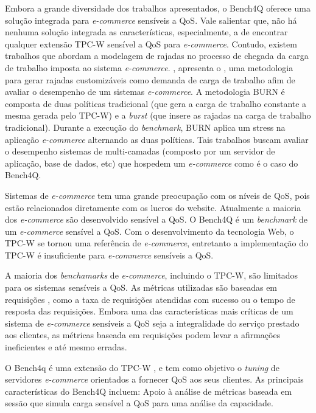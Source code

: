 Embora a grande diversidade dos trabalhos apresentados, o Bench4Q oferece uma solução integrada para \textit{e-commerce} sensíveis a QoS. Vale salientar que, não há nenhuma solução integrada as características, especialmente, a de encontrar qualquer extensão TPC-W sensível a QoS para \textit{e-commerce}. Contudo, existem trabalhos que abordam a modelagem de rajadas no processo de chegada da carga de trabalho imposta ao sistema \textit{e-commerce}. , apresenta o , uma metodologia para gerar rajadas customizáveis como demanda de carga de trabalho afim de avaliar o desempenho de um sistemas \textit{e-commerce}. A metodologia BURN é composta de duas políticas tradicional (que gera a carga de trabalho constante a mesma gerada pelo TPC-W) e a \textit{burst} (que insere as rajadas na carga de trabalho tradicional). Durante a execução do \textit{benchmark}, BURN aplica um stress na aplicação \textit{e-commerce} alternando as duas políticas. Tais trabalhos buscam avaliar o desempenho sistemas de multi-camadas (composto por um servidor de aplicação, base de dados, etc) que hospedem um \textit{e-commerce} como é o caso do Bench4Q.


Sistemas de \textit{e-commerce} tem uma grande preocupação com os níveis de QoS, pois estão relacionados diretamente com os lucros do website. Atualmente a maioria dos \textit{e-commerce} são desenvolvido sensível a QoS. O Bench4Q é um \textit{benchmark} de um \textit{e-commerce} sensível a QoS.  Com o desenvolvimento da tecnologia Web, o TPC-W se tornou uma referência de \textit{e-commerce}, entretanto a implementação do TPC-W é insuficiente para \textit{e-commerce} sensíveis a QoS.

A maioria dos \textit{benchamarks} de \textit{e-commerce}, incluindo o TPC-W, são limitados para os sistemas sensíveis a QoS. As métricas utilizadas são baseadas em requisições , como a taxa de requisições atendidas com sucesso ou o tempo de resposta das requisições. Embora uma das características mais críticas de um sistema de \textit{e-commerce} sensíveis a QoS seja a integralidade do serviço prestado aos clientes, as métricas baseada em requisições podem levar a afirmações ineficientes e até mesmo erradas.

O Bench4q é uma extensão do TPC-W , e tem como objetivo o \textit{tuning} de servidores \textit{e-commerce} orientados a fornecer QoS aos seus clientes. As principais características do Bench4Q incluem: 
Apoio à análise de métricas baseada em sessão que simula carga sensível a QoS para uma análise da capacidade. 

